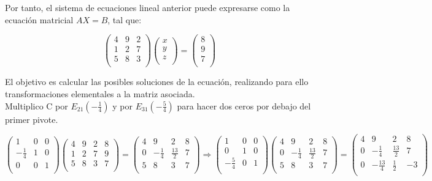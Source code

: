 \documentclass[11pt, a4paper]{article}
\newif\IfInSansMode
\theoremstyle{theorem-style}
\theoremstyle{definition-style}
\theoremstyle{remark-style}
\theoremstyle{example-style}
\begin{document}
Por tanto, el sistema de ecuaciones lineal anterior puede expresarse como la ecuación matricial $AX=B$, tal que:

$$ \begin{pmatrix}
4 & 9 & 2 \\
1 & 2 & 7 \\
5 & 8 & 3 \\
\end{pmatrix}
\begin{pmatrix}
x \\
y \\
z \\
\end{pmatrix} = 
\begin{pmatrix}
8 \\
9 \\
7 \\
\end{pmatrix}$$

El objetivo es calcular las posibles soluciones de la ecuación, realizando para ello transformaciones elementales a la matriz asociada. \\

Multiplico C por $E_{21}(-\frac{1}{4})$ y por $E_{31}(-\frac{5}{4})$ para hacer dos ceros por debajo del primer pivote.

$\begin{pmatrix}
1 & 0 & 0 \\
-\frac{1}{4} & 1 & 0 \\
0 & 0 & 1 \\
\end{pmatrix}
\begin{pmatrix}
4 & 9 & 2 & 8\\
1 & 2 & 7 & 9\\
5 & 8 & 3 & 7\\
\end{pmatrix} = 
\begin{pmatrix}
4 & 9 & 2 & 8\\
0 & -\frac{1}{4} & \frac{13}{2} & 7\\
5 & 8 & 3 & 7\\
\end{pmatrix} \Longrightarrow
\begin{pmatrix}
1 & 0 & 0 \\
0 & 1 & 0 \\
-\frac{5}{4} & 0 & 1 \\
\end{pmatrix}
\begin{pmatrix}
4 & 9 & 2 & 8\\
0 & -\frac{1}{4} & \frac{13}{2} & 7\\
5 & 8 & 3 & 7\\
\end{pmatrix} = 
\begin{pmatrix}
4 & 9 & 2 & 8\\
0 & -\frac{1}{4} & \frac{13}{2} & 7\\
0 & -\frac{13}{4} & \frac{1}{2} & -3\\
\end{pmatrix}$ \\
\end{document}
